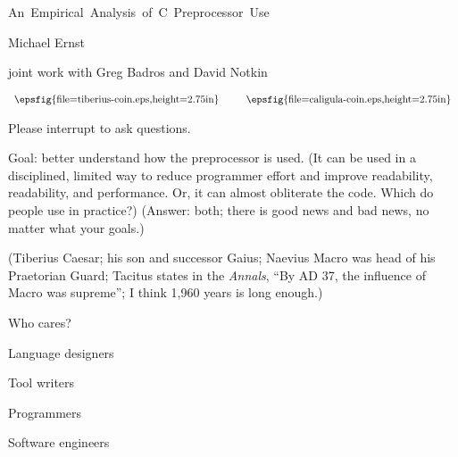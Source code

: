 \documentclass{slides}
\def\slidetitle#1{\begin{center}\large #1 \end{center}}
\begin{document}
\partopsep 0pt
\topsep 0pt

\begin{slide}
\slidetitle{\mbox{\hspace{-36pt}An Empirical Analysis of C Preprocessor Use}}
\vspace{.3in}
\centerline{Michael Ernst}
\vspace{.3in}
\centerline{joint work with Greg Badros and David Notkin}

  $$
  \begin{array}{c}
    \mbox{\epsfig{file=tiberius-coin.eps,height=2.75in}}
  \end{array}
  \mbox{~~~~~}
  \begin{array}{c}
    \mbox{\epsfig{file=caligula-coin.eps,height=2.75in}}
  \end{array}
  $$

\end{slide}

\begin{note}
Please interrupt to ask questions.

Goal: better understand how the preprocessor is used.  (It can be used in a
disciplined, limited way to reduce programmer effort and improve
readability, readability, and performance.   Or, it can almost obliterate
the code.  Which do people use in practice?)  (Answer: both; there is good
news and bad news, no matter what your goals.)

(Tiberius Caesar; his son and successor Gaius; 
Naevius Macro was head of his Praetorian Guard;
Tacitus states in the {\em Annals}, ``By AD 37, the influence of Macro was
supreme''; I think 1,960 years is long enough.)

\end{note}

\begin{slide}
\slidetitle{Who cares?}

Language designers

Tool writers

Programmers

Software engineers
\end{slide}
\end{document}
